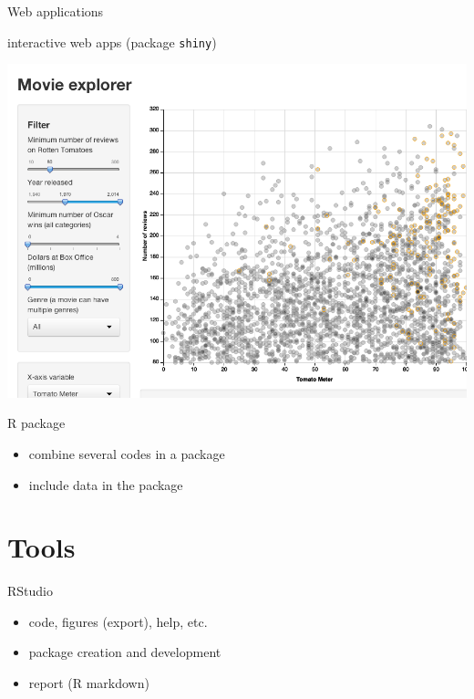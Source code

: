 \documentclass[8pt,ignorenonframetext,]{beamer}
\providecommand{\tightlist}{%
  \setlength{\itemsep}{0pt}\setlength{\parskip}{0pt}}
\begin{document}
\begin{frame}[fragile]{Web applications}

interactive web apps (package \texttt{shiny})

\includegraphics{imgPres/report_movie-explorer.png}

\end{frame}

\begin{frame}{R package}

\begin{itemize}
\tightlist
\item
  combine several codes in a package
\item
  include data in the package
\end{itemize}

\end{frame}

\section{Tools}\label{tools}

\begin{frame}{RStudio}

\begin{itemize}
\tightlist
\item
  code, figures (export), help, etc.
\item
  package creation and development
\item
  report (R markdown)
\end{itemize}

\end{frame}
\end{document}
